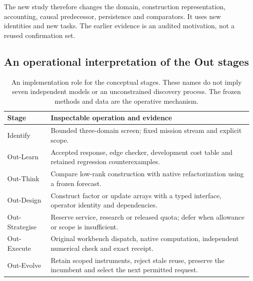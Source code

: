 The new study therefore changes the domain, construction representation, accounting, causal predecessor,
persistence and comparators. It uses new identities and new tasks. The earlier evidence is an audited motivation,
not a reused confirmation set.

\subsection{An operational interpretation of the Out stages}

\begin{table}[htbp]\centering\small
\begin{tabularx}{\linewidth}{@{}L{27mm}Y@{}}\toprule
Stage & Inspectable operation and evidence \\\midrule
Identify & Bounded three-domain screen; fixed mission stream and explicit scope. \\
Out-Learn & Accepted response, edge checker, development cost table and retained regression counterexamples. \\
Out-Think & Compare low-rank construction with native refactorization using a frozen forecast. \\
Out-Design & Construct factor or update arrays with a typed interface, operator identity and dependencies. \\
Out-Strategise & Reserve service, research or released quota; defer when allowance or scope is insufficient. \\
Out-Execute & Original workbench dispatch, native computation, independent numerical check and exact receipt. \\
Out-Evolve & Retain scoped instruments, reject stale reuse, preserve the incumbent and select the next permitted request. \\\bottomrule
\end{tabularx}
\caption{An implementation role for the conceptual stages. These names do not imply seven independent models or
an unconstrained discovery process. The frozen methods and data are the operative mechanism.}
\end{table}
